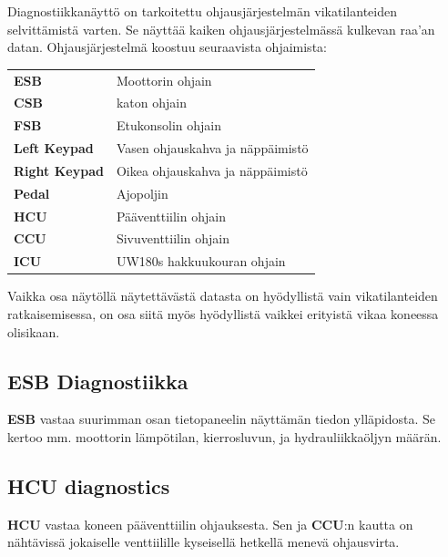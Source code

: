 \documentclass[12pt,a4paper,finnish]{uvmanual}
\begin{document}
Diagnostiikkanäyttö on tarkoitettu ohjausjärjestelmän vikatilanteiden selvittämistä varten. Se näyttää kaiken ohjausjärjestelmässä kulkevan raa'an datan. Ohjausjärjestelmä koostuu seuraavista ohjaimista:

\begin{tabular}{ L{0.2\textwidth} L{0.66\textwidth} }
\textbf{ESB} & Moottorin ohjain \\
\textbf{CSB} & katon ohjain \\
\textbf{FSB} & Etukonsolin ohjain \\
\textbf{Left Keypad} & Vasen ohjauskahva ja näppäimistö \\
\textbf{Right Keypad} & Oikea ohjauskahva ja näppäimistö \\
\textbf{Pedal} & Ajopoljin \\
\textbf{HCU} & Pääventtiilin ohjain \\
\textbf{CCU} & Sivuventtiilin ohjain \\
\textbf{ICU} & UW180s hakkuukouran ohjain \\
\end{tabular}




Vaikka osa näytöllä näytettävästä datasta on hyödyllistä vain vikatilanteiden ratkaisemisessa, on osa siitä myös hyödyllistä vaikkei erityistä vikaa koneessa olisikaan.

\FloatBarrier
\subsection{ESB Diagnostiikka}\label{ch:system_diagnostics_msb}


\textbf{ESB} vastaa suurimman osan tietopaneelin näyttämän tiedon ylläpidosta. Se kertoo mm. moottorin lämpötilan, kierrosluvun, ja hydrauliikkaöljyn määrän.

\FloatBarrier
\subsection{HCU diagnostics}\label{ch:system_diagnostics_ecu}


\textbf{HCU} vastaa koneen pääventtiilin ohjauksesta. Sen ja \textbf{CCU}:n kautta on nähtävissä jokaiselle venttiilille kyseisellä hetkellä menevä ohjausvirta.
\end{document}
